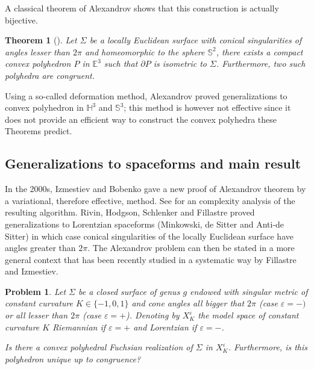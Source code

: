 \documentclass[a4paper,12pt]{article}
\def\H{\mathbb{H}}
\def\E{\mathbf E}
\def\E{\mathbb{E}}
\def\SS{\mathbb{S}}
\def\E{\mathbb{E}}
\newtheorem*{theon}{Theorem}
\newtheorem*{problem}{Problem}
\theoremstyle{definition}
\begin{document}
		A classical theorem of Alexandrov \cite{MR13540} shows that this construction is actually bijective.
		\begin{theon}[\cite{MR13540}] Let $\Sigma$ be a locally Euclidean
			surface with conical singularities of angles lesser than $2\pi$ and homeomorphic to the sphere $\SS^2$,
			there exists a compact convex polyhedron $P$ in $\E^3$ such that $\partial P$ is isometric to $\Sigma$. Furthermore, two such polyhedra are congruent.
		\end{theon}
		Using a so-called deformation method, Alexandrov proved generalizations to convex polyhedron in $\H^3$ and $\SS^3$; this method is however not effective since it does not provide an efficient way to construct the convex polyhedra these Theorems predict.
\subsection{Generalizations to spaceforms and main result}
		
		In the 2000s,
		Izmestiev and Bobenko
		gave a new proof of Alexandrov theorem by a variational, therefore effective, method. See \cite{kane2009pseudopolynomial} for an complexity analysis of the resulting algorithm. Rivin, Hodgson, Schlenker and Fillastre
		proved generalizations to Lorentzian spaceforms (Minkowski, de Sitter and Anti-de Sitter) in which case conical singularities of the locally Euclidean surface have angles greater than $2\pi$.
		The Alexandrov problem can then be stated in a more general context that has been recently studied in a systematic way by Fillastre and Izmestiev. 
		
		\begin{problem}
		
		
		
		 Let $\Sigma$ be a closed surface of genus $g$ endowed with singular metric of constant curvature
	 $K\in \{-1,0,1\}$ and cone angles all bigger that
	 $2\pi$ (case $\varepsilon=-)$ or all lesser than $2\pi$ (case $\varepsilon =+$).
		 Denoting by $X_K^\varepsilon$ the model space of constant curvature $K$ Riemannian if $\varepsilon=+$ and Lorentzian if $\varepsilon=-$.
        
         Is there a convex polyhedral Fuchsian realization of $\Sigma$  in $X_{K}^{\varepsilon}$.
		 Furthermore, is this polyhedron unique up to congruence?
		\end{problem}
\end{document}
